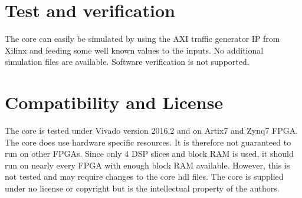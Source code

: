 \section{Test and verification}
\label{sec::test}

The core can easily be simulated by using the AXI traffic generator IP from Xilinx and feeding some well known values to the inputs.
No additional simulation files are available.
Software verification is not supported.

\section{Compatibility and License}
The core is tested under Vivado version 2016.2 and on Artix7 and Zynq7 FPGA.
The core does use hardware specific resources.
It is therefore not guaranteed to run on other FPGAs.
Since only 4 DSP slices and block RAM is used, it should run on nearly every FPGA with enough block RAM available.
However, this is not tested and may require changes to the core hdl files.
The core is supplied under no license or copyright but is the intellectual property of the authors.

